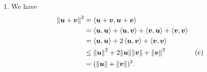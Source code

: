 \begin{enumerate}
\begin{pf}
\begin{enumerate}
\item We have
\begin{align*}
\norm{\vb*{u}+\vb*{v}}^{2}&=\left\langle \vb*{u}+\vb*{v},\vb*{u}+\vb*{v}\right\rangle\\
&=\left\langle \vb*{u},\vb*{u}\right\rangle+\left\langle \vb*{u},\vb*{v}\right\rangle
+\left\langle \vb*{v},\vb*{u}\right\rangle+\left\langle \vb*{v},\vb*{v}\right\rangle \\
&=\left\langle \vb*{u},\vb*{u}\right\rangle+2\left\langle \vb*{u},\vb*{v}\right\rangle
+\left\langle \vb*{v},\vb*{v}\right\rangle \\
&\le\norm{\vb*{u}}^{2}+2\norm{\vb*{u}}\norm{\vb*{v}}+\norm{\vb*{v}}^{2} &\text{(c)}\\
&=(\norm{\vb*{u}}+\norm{\vb*{v}})^{2}.
\end{align*}
\end{enumerate}
\end{pf}
\end{enumerate}
